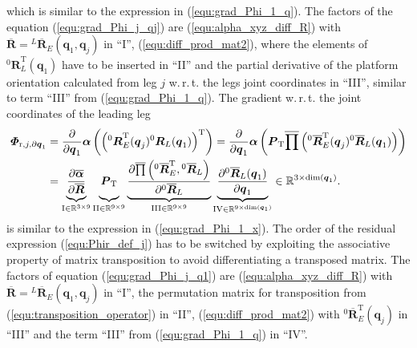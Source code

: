 \documentclass[robotics,article,submit,moreauthors,pdftex]{Definitions/mdpi}
\newcommand{\bm}[1]{\boldsymbol{#1}}
\newcommand{\rotmat}[2]{{{ }^{#1}\boldsymbol{R}}_{#2}}
\newcommand{\rotmato}[2]{{{ }^{#1}\boldsymbol{\overline{R}}}_{#2}}
\newcommand{\transp}[0]{{\mathrm{T}}}
\let\Phi\varPhi
\begin{document}
%
which is similar to the expression in (\ref{equ:grad_Phi_1_q}).
The factors of the equation (\ref{equ:grad_Phi_j_qj}) are
(\ref{equ:alpha_xyz_diff_R}) with $\overline{\bm{R}}=\rotmato{L}{E}(\bm{q}_1,\bm{q}_j)$ in ``I'',
(\ref{equ:diff_prod_mat2}), where the elements of $\rotmat{0}{L}^\transp(\bm{q}_1)$ have to be inserted in ``II'' and
the partial derivative of the platform orientation calculated from leg $j$ w.\,r.\,t. the legs joint coordinates in ``III'', similar to term ``III'' from (\ref{equ:grad_Phi_1_q}).
%
The gradient w.\,r.\,t. the joint coordinates of the leading leg
%
\begin{align}
\bm{\Phi}_{\mathrm{r},j,\partial\bm{q}_1}
&=
\frac{\partial}{\partial \bm{q}_1} \bm{\alpha}\left(\left(\rotmat{0}{E}^\transp(\bm{q}_j) \rotmat{0}{L}(\bm{q}_1) \right)^\transp \right)
=
\frac{\partial}{\partial \bm{q}_1} \bm{\alpha}\left(\bm{P}_{\mathrm{T}}\overline{\prod}\left( \rotmato{0}{E}^\transp(\bm{q}_j) \rotmato{0}{L}(\bm{q}_1)\right)\right)
\label{equ:grad_Phi_j_q1}\\
&=
\underbrace{
	\vphantom{\frac{\partial \overline{\prod}\left( \rotmato{0}{E}^\transp, \rotmato{0}{D}\right)}{\partial \rotmato{0}{D}}}
	\frac{\partial \overline{\bm{\alpha}}}{\partial \overline{\bm{R}}}
	}_{\mathrm{I} \in {\mathbb{R}}^{3 \times 9}}
\underbrace{
	\vphantom{\frac{\partial \overline{\prod}\left( \rotmato{0}{E}^\transp, \rotmato{0}{D}\right)}{\partial \rotmato{0}{D}}}
	\bm{P}_{\mathrm{T}}
	}_{\mathrm{II} \in {\mathbb{R}}^{9 \times 9}}
\underbrace{
	\frac{\partial \overline{\prod}\left( \rotmato{0}{E}^\transp, \rotmato{0}{L}\right)}{\partial \rotmato{0}{L}}
	}_{\mathrm{III} \in {\mathbb{R}}^{9 \times 9}}
\underbrace{
	\frac{\partial \rotmato{0}{L}(\bm{q}_1)}{\partial \bm{q}_1}
	}_{\mathrm{IV} \in {\mathbb{R}}^{9 \times \mathrm{dim}(\bm{q}_1)}}
\in {\mathbb{R}}^{3 \times \mathrm{dim}(\bm{q}_1)}. \nonumber
\end{align}
%
is similar to the expression in (\ref{equ:grad_Phi_1_x}).
The order of the residual expression (\ref{equ:Phir_def_j}) has to be switched by exploiting the associative property of matrix transposition to avoid differentiating a transposed matrix.
The factors of equation (\ref{equ:grad_Phi_j_q1}) are
(\ref{equ:alpha_xyz_diff_R}) with $\overline{\bm{R}}=\rotmato{L}{E}(\bm{q}_1,\bm{q}_j)$ in ``I'',
the permutation matrix for transposition from (\ref{equ:transposition_operator}) in ``II'',
(\ref{equ:diff_prod_mat2}) with $\rotmato{0}{E}^\transp(\bm{q}_j)$ in ``III'' and
the term ``III'' from (\ref{equ:grad_Phi_1_q}) in ``IV''.
\end{document}
